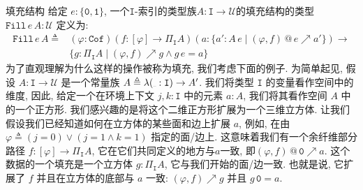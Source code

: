 \documentclass[aspectratio=169,xcolor=dvipsnames]{beamer}
\newcommand\calU{\mathcal{U}}
\newcommand\Fill{\mathtt{Fill}}
\newcommand\ttI{\mathtt{I}}
\newcommand\ttzero{\mathtt{0}}
\newcommand\ttone{\mathtt{1}}
\newcommand{\ul}{{\scalebox{0.4}[0.4]{\_}}}
\newcommand\Cof{\mathtt{Cof}}
\begin{document}
\begin{frame}{填充结构}
  给定 $e : \{\ttzero,\ttone\}$, 一个$\ttI$-索引的类型族$A:\ttI\to\calU$的填充结构的类型 $\Fill\,e\,A : \calU$ 定义为:
  \begin{align*}
    \Fill\,e\,A\triangleq &(\varphi:\Cof)(f:[\varphi]\to\Pi_{\ttI}A)(a:\{a':A\,e\mid(\varphi,f)\,@\,e\nearrow a'\})\to \\
    &\{g:\Pi_{\ttI}A\mid(\varphi,f)\nearrow g\land g\,e=a\}
  \end{align*}
  为了直观理解为什么这样的操作被称为填充, 我们考虑下面的例子. 为简单起见, 假设 $A : \ttI \to \calU$ 是一个常量族 $A\triangleq\lambda(\ul:\ttI)\to A'$. 我们将类型 $\ttI$ 的变量看作空间中的维度, 因此, 给定一个在环境上下文 $j,k:\ttI$ 中的元素 $a:A$, 我们将其看作空间 $A$ 中的一个正方形. 我们感兴趣的是将这个二维正方形扩展为一个三维立方体. 让我们假设我们已经知道如何在立方体的某些面和边上扩展 $a$, 例如, 在由 $\varphi \triangleq (j=0) \lor (j=1\land k=1)$ 指定的面/边上. 这意味着我们有一个余纤维部分路径 $f:[\varphi]\to\Pi_{\ttI}A$, 它在它们共同定义的地方与$a$一致, 即$(\varphi,f)\,@\,\ttzero\nearrow a$. 这个数据的一个填充是一个立方体 $g : \Pi_{\ttI}A$, 它与我们开始的面/边一致. 也就是说, 它扩展了 $f$ 并且在立方体的底部与 $a$ 一致: $(\varphi,f)\nearrow g$ 并且 $g\,\ttzero = a$.
\end{frame}
\end{document}
